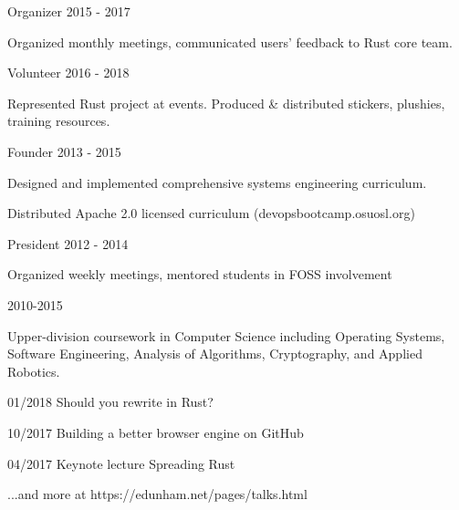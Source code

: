 \documentclass[11pt]{article} %
\begin{document}

\begin{description}
\squish
{}
           {Organizer}
           {2015 - 2017}

Organized monthly meetings, communicated users' feedback to Rust core team.

           {Volunteer}
           {2016 - 2018}

Represented Rust project at events. Produced \& distributed stickers, plushies, training resources.

           {Founder}
           {2013 - 2015}

Designed and implemented comprehensive systems engineering curriculum.

Distributed Apache 2.0 licensed curriculum (devopsbootcamp.osuosl.org)

           {President}
           {2012 - 2014}

Organized weekly meetings, mentored students in FOSS involvement

\end{description}


\begin{description}
\squish
{}
           {}
           {2010-2015}

Upper-division coursework in Computer Science including Operating Systems,\\
Software Engineering, Analysis of Algorithms, Cryptography, and Applied Robotics.

\end{description}


\squish

      {01/2018}
      {}
      {Should you rewrite in Rust?}

      {10/2017}
      {}
      {Building a better browser engine on GitHub}

      {04/2017}
      {Keynote lecture}
      {Spreading Rust}

\hfill \small ...and more at https://edunham.net/pages/talks.html
\end{document}
